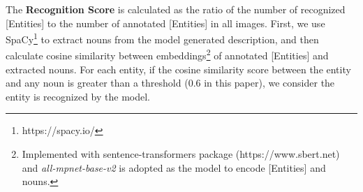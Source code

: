The \textbf{Recognition Score} is calculated as the ratio of the number of recognized [Entities] to the number of annotated [Entities] in all images.
First, we use SpaCy\footnote{https://spacy.io/} to extract nouns from the model generated description, and then calculate cosine similarity between embeddings\footnote{Implemented with sentence-transformers package (https://www.sbert.net) and \textit{all-mpnet-base-v2} is adopted as the model to encode [Entities] and nouns.} of annotated [Entities] and extracted nouns. 
For each entity, if the cosine similarity score between the entity and any noun is greater than a threshold (0.6 in this paper), we consider the entity is recognized by the model. 




